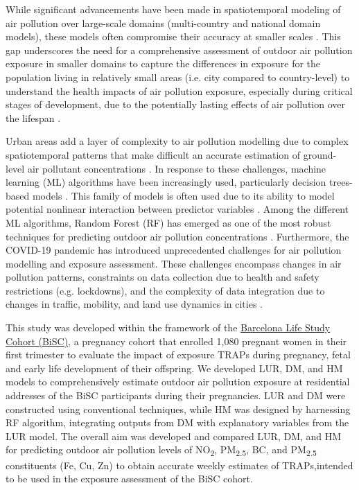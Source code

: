 \documentclass{article}
\begin{document}
While significant advancements have been made in spatiotemporal modeling of air pollution over large-scale domains (multi-country and national domain models), these models often compromise their accuracy at smaller scales \cite{dehoogh2016, chen2019, chen2020, shen2022}. This gap underscores the need for a comprehensive assessment of outdoor air pollution exposure in smaller domains to capture the differences in exposure for the population living in relatively small areas (i.e. city compared to country-level) to understand the health impacts of air pollution exposure, especially during critical stages of development, due to the potentially lasting effects of air pollution over the lifespan \cite{selevan2000, wick2010, ghosh2021}.

Urban areas add a layer of complexity to air pollution modelling due to complex spatiotemporal patterns that make difficult an accurate estimation of ground-level air pollutant concentrations \cite{sokhi2022}. In response to these challenges, machine learning (ML) algorithms have been increasingly used, particularly decision trees-based models \cite{liu2022}. This family of models is often used due to its ability to model potential nonlinear interaction between predictor variables \cite{liu2022treebased}. Among the different ML algorithms, Random Forest (RF) has emerged as one of the most robust techniques for predicting outdoor air pollution concentrations \cite{chen2019, chen2020, stafoggia2019, stafoggia2020, schneider2020, mila2023}. Furthermore, the COVID-19 pandemic has introduced unprecedented challenges for air pollution modelling and exposure assessment. These challenges encompass changes in air pollution patterns, constraints on data collection due to health and safety restrictions (e.g. lockdowns), and the complexity of data integration due to changes in traffic, mobility, and land use dynamics in cities \cite{gonzalez2022, querol2021}. 
 
This study was developed within the framework of the  \href{https://projectebisc.org/en/home/}{Barcelona Life Study Cohort (BiSC)}, a pregnancy cohort that enrolled 1,080 pregnant women in their first trimester to evaluate the impact of exposure TRAPs during pregnancy, fetal and early life development of their offspring. We developed LUR, DM, and HM models to comprehensively estimate outdoor air pollution exposure at residential addresses of the BiSC participants during their pregnancies. LUR and DM were constructed using conventional techniques, while HM was designed by harnessing RF algorithm, integrating outputs from DM with explanatory variables from the LUR model. The overall aim was developed and compared LUR, DM, and HM for predicting outdoor air pollution levels of NO\textsubscript{2}, PM\textsubscript{2.5}, BC, and PM\textsubscript{2.5} constituents (Fe, Cu, Zn) to obtain accurate weekly estimates of TRAPs,intended to be used in the exposure assessment of the BiSC cohort.
\end{document}
